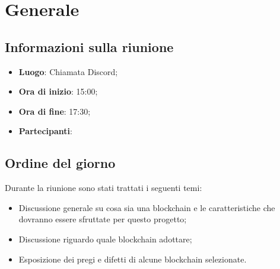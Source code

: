\section{Generale}

\vspace{10pt}


\subsection{Informazioni sulla riunione}
\begin{itemize}
	\item \textbf{Luogo}: Chiamata Discord;
	\item \textbf{Ora di inizio}: 15:00;
	\item \textbf{Ora di fine}: 17:30;
	\item \textbf{Partecipanti}: \team
\end{itemize}

\vspace{5pt}

\subsection{Ordine del giorno}
Durante la riunione sono stati trattati i seguenti temi:
\begin{itemize}
	\item Discussione generale su cosa sia una blockchain\glo{} e le caratteristiche che dovranno essere sfruttate per questo progetto;
	\item Discussione riguardo quale blockchain\glo{} adottare;
	\item Esposizione dei pregi e difetti di alcune blockchain\glo{} selezionate.
\end{itemize}
